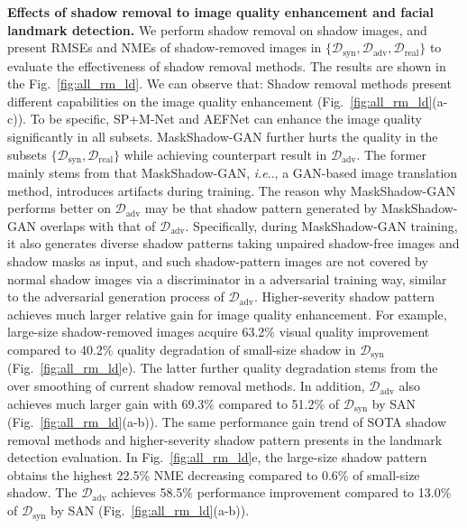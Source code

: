 \documentclass[10pt,twocolumn,letterpaper]{article}
\makeatletter
\newcommand{\figref}[1]{Fig.~\ref{#1}}
\DeclareRobustCommand\onedot{\futurelet\@let@token\@onedot}
\def\@onedot{\ifx\@let@token.\else.\null\fi\xspace}
\def\ie{\emph{i.e}\onedot} \def\Ie{\emph{I.e}\onedot}
\renewcommand{\paragraph}[1]{\vspace{1.25mm}\noindent\textbf{#1}}
\makeatother
\begin{document}
\paragraph{Effects of shadow removal to image quality enhancement and facial landmark detection.} We perform shadow removal on shadow images, and present RMSEs and NMEs of shadow-removed images in $\{\mathcal{D}_\text{syn}, \mathcal{D}_\text{adv}, \mathcal{D}_\text{real}\}$ to evaluate the effectiveness of shadow removal methods. The results are shown in the \figref{fig:all_rm_ld}. We can observe that: 
 Shadow removal methods present different capabilities on the image quality enhancement (\figref{fig:all_rm_ld}(a-c)). To be specific, SP+M-Net \cite{le2019shadow} and AEFNet \cite{fu2021auto} can enhance the image quality significantly in all subsets. MaskShadow-GAN \cite{hu2019mask} further hurts the quality in the subsets $\{\mathcal{D}_\text{syn}, \mathcal{D}_\text{real}\}$ while achieving counterpart result in $\mathcal{D}_\text{adv}$. The former mainly stems from that MaskShadow-GAN, \ie, a GAN-based image translation method, introduces artifacts during training. The reason why MaskShadow-GAN performs better on $\mathcal{D}_\text{adv}$ may be that shadow pattern generated by MaskShadow-GAN overlaps with that of $\mathcal{D}_\text{adv}$. Specifically, during MaskShadow-GAN training, it also generates diverse shadow patterns taking unpaired shadow-free images and shadow masks as input, and such shadow-pattern images are not covered by normal shadow images via a discriminator in a adversarial training way, similar to the adversarial generation process of $\mathcal{D}_\text{adv}$. 
 Higher-severity shadow pattern achieves much larger relative gain for image quality enhancement. 
For example, large-size shadow-removed images acquire 63.2\% visual quality improvement compared to 40.2\% quality degradation of small-size shadow in $\mathcal{D}_\text{syn}$ (\figref{fig:all_rm_ld}e). The latter further quality degradation stems from the over smoothing of current shadow removal methods. In addition, $\mathcal{D}_\text{adv}$ also achieves much larger gain with 69.3\% compared to 51.2\% of $\mathcal{D}_\text{syn}$ by SAN (\figref{fig:all_rm_ld}(a-b)). 
 The same performance gain trend of SOTA shadow removal methods and higher-severity shadow pattern presents in the landmark detection evaluation. In \figref{fig:all_rm_ld}e, the large-size shadow pattern obtains the highest 22.5\% NME decreasing compared to 0.6\% of small-size shadow. The $\mathcal{D}_\text{adv}$ achieves 58.5\% performance improvement compared to 13.0\% of $\mathcal{D}_\text{syn}$ by SAN (\figref{fig:all_rm_ld}(a-b)).
\end{document}
